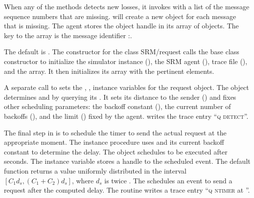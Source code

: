 When any of the methods detects new losses, it invokes
with a list of the message sequence numbers that are missing.
 will create a new 
object for each message that is missing.
The agent stores the object handle in its array of  objects.
The key to the array is the message identifier :.
\begin{list}{}{}
\item 
  The default  is .
  The constructor for the class SRM/request
  calls the base class constructor to initialize 
  the simulator instance (), the SRM agent (),
  trace file (), and the  array.
  It then initializes its  array with the pertinent elements.

\item
  A separate call to
  sets the , ,  instance variables for
  the request object.
  The object determines  and  by querying its .
  It sets its distance to the sender ()
  and fixes other scheduling parameters:
  the backoff constant (),
  the current number of backoffs (),
  and the limit () fixed by the agent.
   writes the trace entry ``\textsc{q detect}''.

\item
  The final step in  is to schedule the timer
  to send the actual request at the appropriate moment.
  The instance procedure
  uses 
  and its current backoff constant to determine the delay.
  The object schedules
  to be executed after  seconds.
  The instance variable  stores a handle to the scheduled event.
  The default  function returns a value
  uniformly distributed in the interval $[C_1 d_s, (C_1 + C_2) d_s]$,
  where $d_s$ is twice .
  The  schedules an event to send a request
  after the computed delay. 
  The routine writes a trace entry ``\textsc{q ntimer } at ''.
\end{list}

